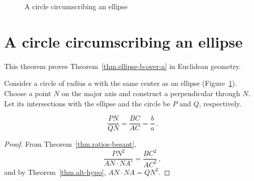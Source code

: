 \begin{figure}[b]
\begin{center}
\caption{A circle circumscribing an ellipse}\label{f.ellipse-circle-besant}
\end{center}
\end{figure}


\section{A circle circumscribing an ellipse}

This theorem proves Theorem~\ref{thm.ellipse-b-over-a} in Euclidean geometry.

Consider a circle of radius $a$ with the same center as an ellipse (Figure~\ref{f.ellipse-circle-besant}). Choose a point $N$ on the major axis and construct a perpendicular through $N$. Let its intersections with the ellipse and the circle be $P$ and $Q$, respectively.
\begin{theorem}\label{thm.ellipse-b-over-a-besant}
\[
\frac{PN}{QN}=\frac{BC}{AC}=\frac{b}{a}\,.
\]
\end{theorem}
\begin{proof} 
From Theorem~\ref{thm.ratios-besant},
\[
\frac{PN^2}{AN\cdot NA'} = \frac{BC^2}{AC^2}\,,
\]
and by Theorem~\ref{thm.alt-hypo}, $AN\cdot NA=QN^2$.\hqed
\end{proof}

